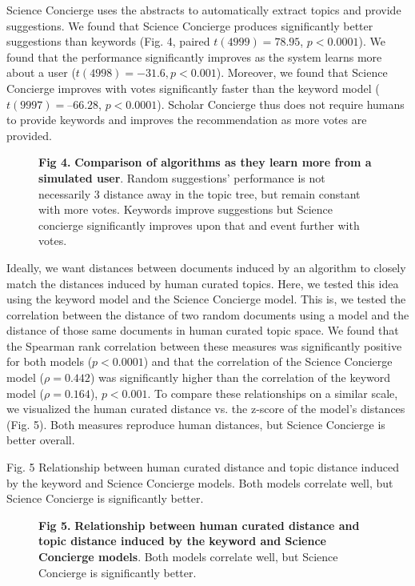 \documentclass[a4paper]{article}
\begin{document}
Science Concierge uses the abstracts to automatically extract topics and provide suggestions. We found that Science Concierge produces significantly better suggestions than keywords (Fig. 4, paired $t(4999) = 78.95$, $p < 0.0001$). We found that the performance significantly improves as the system learns more about a user ($t(4998) = -31.6, p < 0.001$). Moreover, we found that Science Concierge improves with votes significantly faster than the keyword model ($t(9997) = –66.28$, $p < 0.0001$). Scholar Concierge thus does not require humans to provide keywords and improves the recommendation as more votes are provided.


\begin{figure}[!ht]
\centering
\caption*{\textbf{Fig 4.} \textbf{Comparison of algorithms as they learn more from a simulated user}. Random suggestions’ performance is not necessarily 3 distance away in the topic tree, but remain constant with more votes. Keywords improve suggestions but Science concierge significantly improves upon that and event further with votes.}
\end{figure}

Ideally, we want distances between documents induced by an algorithm to closely match the distances induced by human curated topics. Here, we tested this idea using the keyword model and the Science Concierge model. This is, we tested the correlation between the distance of two random documents using a model and the distance of those same documents in human curated topic space. We found that the Spearman rank correlation between these measures was significantly positive for both models ($p < 0.0001$) and that the correlation of the Science Concierge model ($\rho=0.442$) was significantly higher than the correlation of the keyword model ($\rho=0.164$), $p < 0.001$. To compare these relationships on a similar scale, we visualized the human curated distance vs. the z-score of the model’s distances (Fig. 5). Both measures reproduce human distances, but Science Concierge is better overall.

Fig. 5 Relationship between human curated distance and topic distance induced by the keyword and Science Concierge models. Both models correlate well, but Science Concierge is significantly better.

\begin{figure}[!ht]
\textbf{Fig 5.} \textbf{Relationship between human curated distance and topic distance induced by the keyword and Science Concierge models}. Both models correlate well, but Science Concierge is significantly better.
\end{figure}
\end{document}
